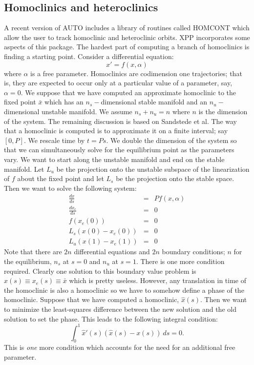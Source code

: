 \documentclass{article}
\begin{document}
\subsection{Homoclinics and heteroclinics}  A recent version of AUTO
includes a library of routines called HOMCONT which allow the user to
track homoclinic and heteroclinic orbits.  XPP incorporates some
aspects of this package. The hardest part of computing a branch of
homoclinics is finding a starting point.  Consider a differential
equation:
\[
 x'=f(x,\alpha)
\]
where $\alpha$ is a free parameter. Homoclinics are codimension one
trajectories; that is, they are expected to occur only at a particular
value of a parameter, say, $\alpha=0.$  We suppose that we have
computed an approximate homoclinic to the fixed point $\bar{x}$ which
has an $n_s-$dimensional stable manifold and an $n_u-$dimensional
unstable manifold. We assume $n_s+n_u=n$ where $n$ is the dimension of
the system. The remaining discussion is based on Sandstede et al. 
The way that a homoclinic is computed is to
approximate it on a finite interval; say $[0,P].$ We rescale time by
$t=Ps.$ We double the dimension of the system so that we can
simultaneously solve for the equilibrium point as the parameters vary.
We want to start along the unstable manifold and end on the stable
manifold. Let $L_u$ be the projection onto the unstable subspace of
the linearization of $f$ about the fixed point and let $L_s$ be the
projection onto the stable space.  Then we want to solve the following
system:
\begin{eqnarray*}
\frac{dx}{ds} &=& P f(x,\alpha) \\
\frac{dx_e}{ds}&=& 0 \\
f(x_e(0)) &=& 0 \\
L_s (x(0)-x_e(0)) &=& 0 \\
L_u (x(1)-x_e(1)) &=& 0 
\end{eqnarray*}
Note that there are $2n$ differential equations and $2n$ boundary
conditions; $n$ for the equilibrium, $n_s$ at $s=0$ and $n_u$ at
$s=1.$  There is one more condition required.  Clearly one solution to
this boundary value problem is $x(s)\equiv x_e(s)\equiv \bar{x}$ which
is pretty useless.  However, any translation in time of the homoclinic
is also a homoclinic so we have to somehow define a phase of the
homoclinic.  Suppose that we have computed a homoclinic, $\hat{x}(s).$
Then we want to minimize the least-squares difference between the new
solution and the old solution to set the phase. This leads to the
following integral condition:
\[
 \int_0^1 \hat{x}'(s)(\hat{x}(s)-x(s))\ ds = 0.
\]
This is {\em one} more condition which accounts for the need for an
additional free parameter.  
\end{document}
